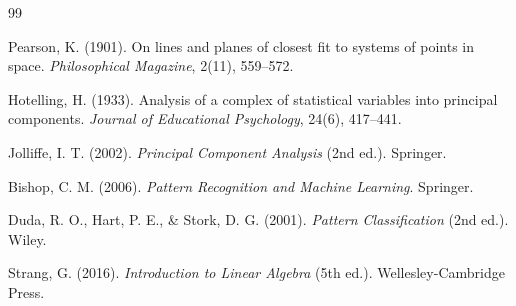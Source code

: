 \documentclass[11pt,letterpaper]{article}
\begin{document}
	\newpage
	\renewcommand{\refname}{Bibliografía}
	\begin{thebibliography}{99}
		
		 Pearson, K. (1901). On lines and planes of closest fit to systems of points in space. \textit{Philosophical Magazine}, 2(11), 559--572.
		
		 Hotelling, H. (1933). Analysis of a complex of statistical variables into principal components. \textit{Journal of Educational Psychology}, 24(6), 417--441.
		
		 Jolliffe, I. T. (2002). \textit{Principal Component Analysis} (2nd ed.). Springer.
		
		 Bishop, C. M. (2006). \textit{Pattern Recognition and Machine Learning}. Springer.
		
		 Duda, R. O., Hart, P. E., \& Stork, D. G. (2001). \textit{Pattern Classification} (2nd ed.). Wiley.
		
		 Strang, G. (2016). \textit{Introduction to Linear Algebra} (5th ed.). Wellesley-Cambridge Press.
		
	\end{thebibliography}
	
\end{document}
